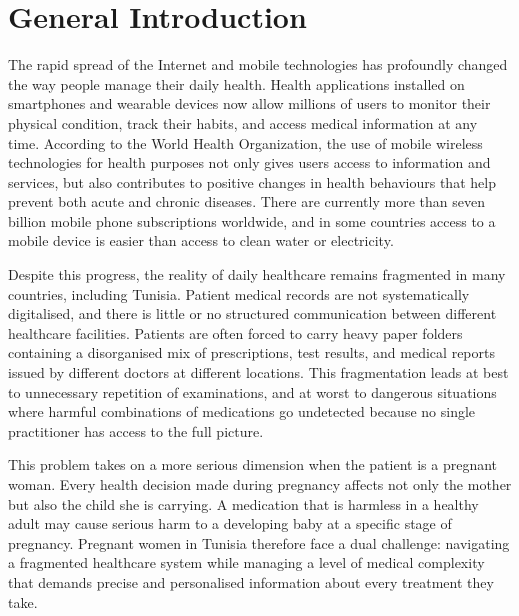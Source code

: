 
\chapter*{General Introduction}

The rapid spread of the Internet and mobile technologies has profoundly changed the way
people manage their daily health. Health applications installed on smartphones and
wearable devices now allow millions of users to monitor their physical condition, track
their habits, and access medical information at any time. According to the World Health
Organization, the use of mobile wireless technologies for health purposes not only gives
users access to information and services, but also contributes to positive changes in
health behaviours that help prevent both acute and chronic diseases. There are currently
more than seven billion mobile phone subscriptions worldwide, and in some countries
access to a mobile device is easier than access to clean water or electricity.

Despite this progress, the reality of daily healthcare remains fragmented in many
countries, including Tunisia. Patient medical records are not systematically digitalised,
and there is little or no structured communication between different healthcare facilities.
Patients are often forced to carry heavy paper folders containing a disorganised mix of
prescriptions, test results, and medical reports issued by different doctors at different
locations. This fragmentation leads at best to unnecessary repetition of examinations, and
at worst to dangerous situations where harmful combinations of medications go undetected
because no single practitioner has access to the full picture.

This problem takes on a more serious dimension when the patient is a pregnant woman.
Every health decision made during pregnancy affects not only the mother but also the
child she is carrying. A medication that is harmless in a healthy adult may cause serious
harm to a developing baby at a specific stage of pregnancy. Pregnant women in Tunisia
therefore face a dual challenge: navigating a fragmented healthcare system while managing
a level of medical complexity that demands precise and personalised information about
every treatment they take.

